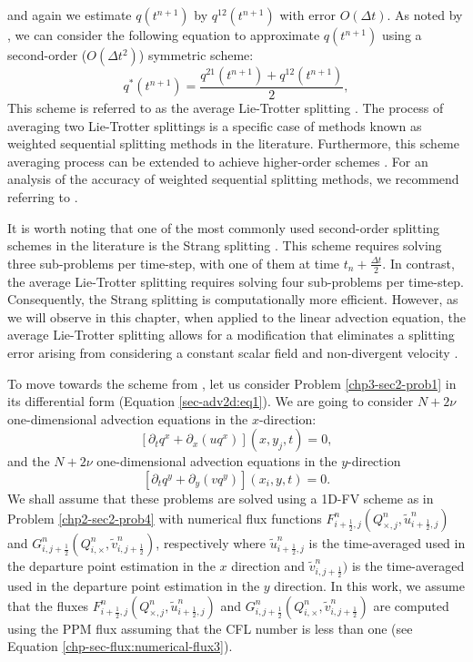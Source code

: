 and again we estimate $q(t^{n+1})$ by $q^{12}(t^{n+1})$ with error $O(\Delta t)$.
As noted by \citet{strang:1968}, we can consider the following equation 
to approximate $q(t^{n+1})$ using a second-order ($O(\Delta t^2)$) symmetric scheme:
\begin{equation}
	q^*(t^{n+1}) = \frac{q^{21}(t^{n+1}) + q^{12}(t^{n+1})}{2},
\end{equation}
This scheme is referred to as the average Lie-Trotter splitting \citep{holden:2010}.
The process of averaging two Lie-Trotter splittings is a specific case of methods
known as weighted sequential splitting methods in the literature.
Furthermore, this scheme averaging process can be extended to achieve higher-order schemes \citep{jia:2011}.
For an analysis of the accuracy of weighted sequential splitting methods, we recommend referring to \citet{csomos:2005}.

It is worth noting that one of the most commonly used second-order splitting schemes in the literature is the Strang splitting
\citep{strang:1968}.
This scheme requires solving three sub-problems per time-step, with one of them at time $t_n + \frac{\Delta t}{2}$.
In contrast, the average Lie-Trotter splitting requires solving four sub-problems per time-step.
Consequently, the Strang splitting is computationally more efficient.
However, as we will observe in this chapter, when applied to the linear advection equation, 
the average Lie-Trotter splitting allows for a modification that eliminates a splitting error
arising from considering a constant scalar field and non-divergent velocity \citep{lin:1996}.

To move towards the scheme from \citep{lin:1996}, let us consider Problem \ref{chp3-sec2-prob1} in its differential form (Equation \eqref{sec-adv2d:eq1}).
We are going to consider $N+2\nu$ one-dimensional advection equations in the $x$-direction:
\begin{equation*}
	\label{chp3-adv2deq-xdir1}
	[{\partial_t q^x}+{\partial_x (uq^x)}](x, y_j, t)
	= 0,
\end{equation*}
and the $N+2\nu$ one-dimensional advection equations in the $y$-direction
\begin{equation*}
	\label{chp3-adv2deq-ydir1}
	[{\partial_t q^y} +{\partial_y (vq^y)}](x_i, y, t) = 0.   
\end{equation*}
We shall assume that these problems are solved using a 1D-FV scheme as in Problem \ref{chp2-sec2-prob4}
with numerical flux functions ${F}_{i+\frac{1}{2},j}^n(Q^n_{\times,j},\tilde{u}^n_{i+\frac{1}{2},j})$ and
${G}^n_{i,j+\frac{1}{2}}(Q^n_{i,\times},\tilde{v}^n_{i,j+\frac{1}{2}})$, respectively
where $\tilde{u}^n_{i+\frac{1}{2},j}$ is the time-averaged used in the departure point estimation in the $x$ direction
and $\tilde{v}^n_{i,j+\frac{1}{2}})$ is the time-averaged used in the departure point estimation in the $y$ direction.
In this work, we assume that the fluxes ${F}_{i+\frac{1}{2},j}^n(Q^n_{\times,j},\tilde{u}^n_{i+\frac{1}{2},j})$ and
${G}^n_{i,j+\frac{1}{2}}(Q^n_{i,\times} ,\tilde{v}^n_{i,j+\frac{1}{2}})$ are computed using the PPM flux
assuming that the CFL number is less than one (see Equation \eqref{chp-sec-flux:numerical-flux3}).

